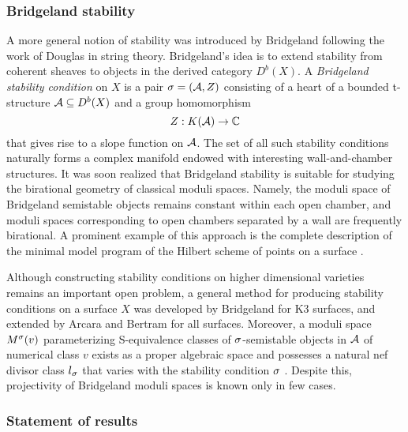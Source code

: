\documentclass[letterpaper,11pt]{amsart}%
\theoremstyle{remark}
\begin{document}
\subsubsection*{Bridgeland stability}

A more general notion of stability was introduced by Bridgeland \cite{bridgeland} following the work of Douglas in string theory. Bridgeland's idea is to extend stability from coherent sheaves to objects in the derived category $D^b(X)$. A \textit{Bridgeland stability condition} on $X$ is a pair $\sigma = (\mathcal{A}, Z)$ consisting of a heart of a bounded t-structure $\mathcal{A} \subseteq D^b(X)$ and a group homomorphism 
\[ Z: K(\mathcal{A}) \to \mathbb{C} \]
that gives rise to a slope function on $\mathcal{A}$. The set of all such stability conditions naturally forms a complex manifold endowed with interesting wall-and-chamber structures. It was soon realized that Bridgeland stability is suitable for studying the birational geometry of classical moduli spaces. Namely, the moduli space of Bridgeland semistable objects remains constant within each open chamber, and moduli spaces corresponding to open chambers separated by a wall are frequently birational. A prominent example of this approach is the complete description of the minimal model program of the Hilbert scheme of points on a surface \cite{ABCH}.

Although constructing stability conditions on higher dimensional varieties remains an important open problem, a general method for producing stability conditions on a surface $X$ was developed by Bridgeland \cite{bridgelandK3} for K3 surfaces, and extended by Arcara and Bertram \cite{ABL13} for all surfaces. Moreover, a moduli space $M^\sigma(v)$ parameterizing S-equivalence classes of $\sigma$-semistable objects in $\mathcal{A}$ of numerical class $v$ exists as a proper algebraic space \cite[Theorem 7.25, Example 7.27]{AHLH} and possesses a natural nef divisor class $l_\sigma$ that varies with the stability condition $\sigma$ \cite{BM}. Despite this, projectivity of Bridgeland moduli spaces is known only in few cases.

\subsubsection*{Statement of results}
\end{document}

